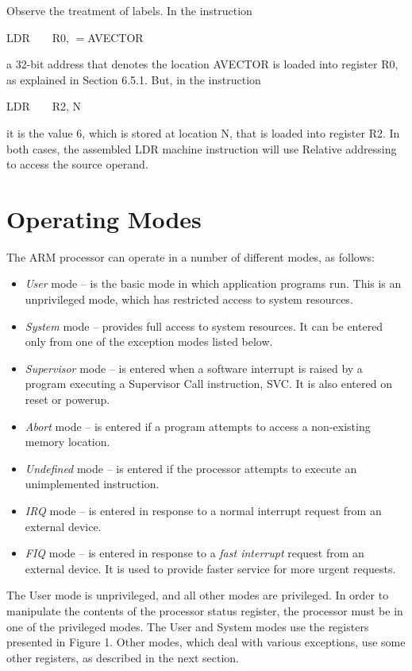 \documentclass[11pt, twoside, pdftex]{article}
\begin{document}
\noindent
Observe the treatment of labels. In the instruction
\begin{center}
LDR~~~~R0, $=$AVECTOR
\end{center}
\noindent
a 32-bit address that denotes the location AVECTOR is loaded
into register R0, as explained in Section 6.5.1. But, in the
instruction
\begin{center}
LDR~~~~R2, N
\end{center}
\noindent
it is the value 6, which is stored at location N, that is
loaded into register R2. In both cases, the assembled LDR
machine instruction will use Relative addressing to access
the source operand.

\newpage

\section{Operating Modes}

The ARM processor can operate in a number of different modes,
as follows:
\begin{itemize}
\item {\it User} mode -- is the basic mode in which application
programs run. This is an unprivileged mode, which has restricted
access to system resources.
\item {\it System} mode -- provides full access to system
resources. It can be entered only from one of the exception
modes listed below.
\item {\it Supervisor} mode -- is entered when a software
interrupt is raised by a program executing a Supervisor Call
instruction, SVC. It is also entered on reset or powerup.
\item {\it Abort} mode -- is entered if a program attempts to
access a non-existing memory location.
\item {\it Undefined} mode -- is entered if the processor
attempts to execute an unimplemented instruction.
\item {\it IRQ} mode -- is entered in response to a normal
interrupt request from an external device.
\item {\it FIQ} mode -- is entered in response to a
{\it fast interrupt} request from an external device.
It is used to provide faster service for more urgent requests.
\end{itemize}

\noindent
The User mode is unprivileged, and all other modes are
privileged. In order to manipulate the contents of the processor
status register, the processor must be in one of the privileged
modes. The User and System modes use the registers presented
in Figure 1. Other modes, which deal with various exceptions,
use some other registers, as described in the next section.
\end{document}
